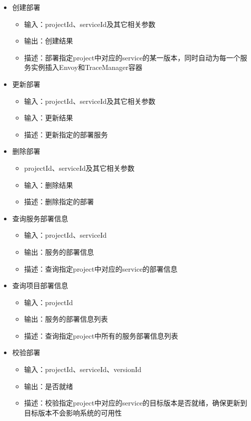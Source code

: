 \documentclass[a4paper, 12pt]{article}
\theoremstyle{definition}
\begin{document}
\begin{itemize}
	\item{创建部署
		\begin{itemize}
		\item 输入：projectId、serviceId及其它相关参数
		\item 输出：创建结果
		\item 描述：部署指定project中对应的service的某一版本，同时自动为每一个服务实例插入Envoy和TraceManager容器
		\end{itemize}}
	\item{更新部署
		\begin{itemize}
		\item 输入：projectId、serviceId及其它相关参数
		\item 输入：更新结果
		\item 描述：更新指定的部署服务
		\end{itemize}}
	\item{删除部署
		\begin{itemize}
		\item projectId、serviceId及其它相关参数
		\item 输入：删除结果
		\item 描述：删除指定的部署
		\end{itemize}}
	\item{查询服务部署信息
		\begin{itemize}
		\item 输入：projectId、serviceId
		\item 输出：服务的部署信息
		\item 描述：查询指定project中对应的service的部署信息
		\end{itemize}}
	\item{查询项目部署信息
		\begin{itemize}
		\item 输入：projectId
		\item 输出：服务的部署信息列表
		\item 描述：查询指定project中所有的服务部署信息列表
		\end{itemize}}
	\item{校验部署
		\begin{itemize}
		\item 输入：projectId、serviceId、versionId
		\item 输出：是否就绪
		\item 描述：校验指定project中对应的service的目标版本是否就绪，确保更新到目标版本不会影响系统的可用性
		\end{itemize}}

\end{itemize}
\end{document}

